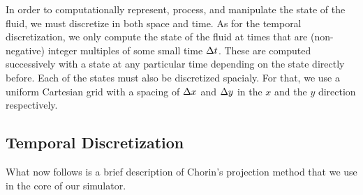 \documentclass[11pt,a4paper,twoside,openright]{report}
\begin{document}
In order to computationally represent, process, and manipulate the state of the fluid, we must discretize in both space and time. As for the temporal discretization, we only compute the state of the fluid at times that are (non-negative) integer multiples of some small time $\Delta t$. These are computed successively with a state at any particular time depending on the state directly before. Each of the states must also be discretized spacialy. For that, we use a uniform Cartesian grid with a spacing of $\Delta x$ and $\Delta y$ in the $x$ and the $y$ direction respectively.

\subsection{Temporal Discretization}
What now follows is a brief description of Chorin's projection method that we use in the core of our simulator.
\end{document}
